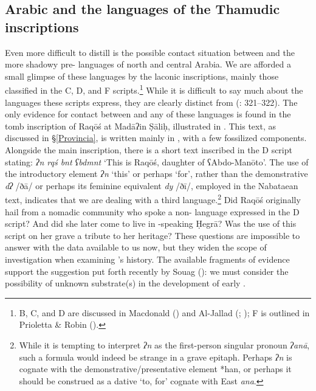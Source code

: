 \documentclass[output=paper]{langsci/langscibook}
\begin{document}
\subsection{Arabic and the languages of the Thamudic inscriptions}\largerpage
Even more difficult to distill is the possible contact situation between  and the more shadowy pre-  languages of north and central Arabia. We are afforded a small glimpse of these languages by the laconic  inscriptions, mainly those classified in the C, D, and F scripts.\footnote{ B, C, and D are discussed in Macdonald (\citeyear{Macdonald2000}) and Al-Jallad (\citeyear{Al-Jallad2017early}; \citeyear{Al-Jallad2018ANA});  F is outlined in Prioletta \& Robin (\citeyear{PriolettaRobin2018}).}  While it is difficult to say much about the languages these scripts express, they are clearly distinct from  (\citealt{Al-Jallad2017early}: 321--322). The only evidence for contact between  and any of these languages is found in the tomb inscription of Raqōś at Madāʔin Ṣāliḥ, illustrated in . This text, as discussed in §\ref{Provincia}, is written mainly in , with a few fossilized  components. Alongside the main inscription, there is a short text inscribed in the  D script stating: \textit{ʔn rqś bnt ʕbdmnt} ‘This is Raqōś, daughter of ʕAbdo-Manōto’. The use of the introductory element \textit{ʔn} `this' or perhaps `for', rather than the  demonstrative \textit{dʔ} /ðā/ or perhaps its feminine equivalent \textit{dy} /ðī/, employed in the Nabataean text, indicates that we are dealing with a third language.\footnote{While it is tempting to interpret \textit{ʔn} as the first-person singular pronoun \textit{ʔanā}, such a formula would indeed be strange in a grave epitaph. Perhaps \textit{ʔn} is {cognate} with the demonstrative/presentative element *han, or perhaps it should be construed as a dative `to, for' {cognate} with East  \textit{ana}.} Did Raqōś originally hail from a nomadic community who spoke a non-  language expressed in the  D script? And did she later come to live in -speaking Ḥegrā? Was the use of this script on her grave a tribute to her heritage? These {questions} are impossible to answer with the data available to us now, but they widen the scope of investigation when examining ’s history. The available fragments of evidence support the suggestion put forth recently by Souag (\citeyear{Souag2018blog}): we must consider the possibility of unknown  {substrate}(s) in the development of early .
\end{document}

